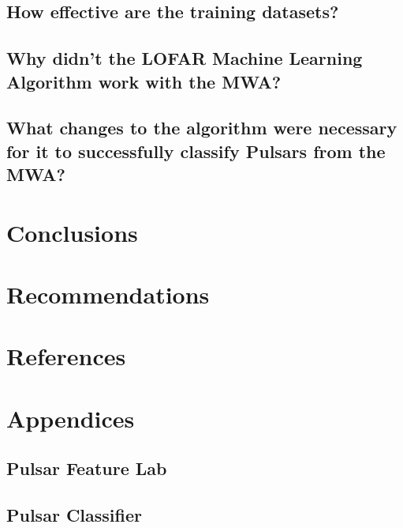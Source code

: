 \documentclass{article}
\begin{document}
\subsection{How effective are the training datasets?}
\subsection{Why didn't the LOFAR Machine Learning Algorithm work with the MWA?}
\subsection{What changes to the algorithm were necessary for it to successfully classify Pulsars from the MWA?}

\pagebreak
\section{Conclusions}

\section{Recommendations}

\pagebreak
\section{References}
\printbibliography[heading=none]

\pagebreak
\section{Appendices}
\subsection{Pulsar Feature Lab}
\subsection{Pulsar Classifier}

\end{document}
